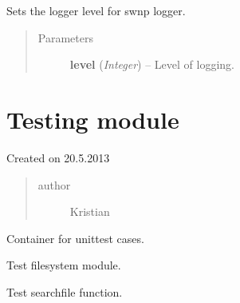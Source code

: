 \documentclass[letterpaper,10pt,english]{sphinxmanual}
\begin{document}

\begin{fulllineitems}
\label{swnp:swnp.set_logger_level}
Sets the logger level for swnp logger.
\begin{quote}\begin{description}
\item[{Parameters}] \leavevmode
\textbf{level} (\emph{Integer}) -- Level of logging.

\end{description}\end{quote}

\end{fulllineitems}



\section{Testing module}
\label{testing:module-testing}\label{testing:testing-module}\label{testing::doc}
Created on 20.5.2013
\begin{quote}\begin{description}
\item[{author}] \leavevmode
Kristian

\end{description}\end{quote}

\begin{fulllineitems}
\label{testing:testing.DiwaTest}
Container for unittest cases.

\end{fulllineitems}


\begin{fulllineitems}
\label{testing:testing.TestFilesystem}
Test filesystem module.

\begin{fulllineitems}
\label{testing:testing.TestFilesystem.test_searchfile}
Test searchfile function.

\end{fulllineitems}


\end{fulllineitems}
\end{document}
